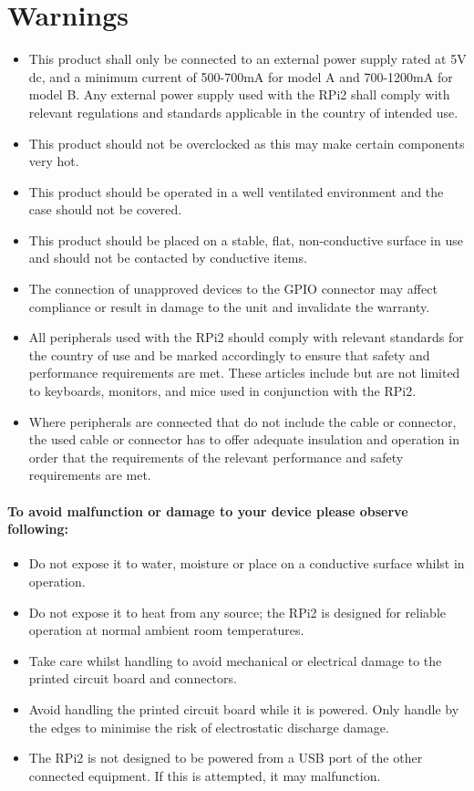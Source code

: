 \section{Warnings}
\begin{itemize}
\item This product shall only be connected to an external power supply rated at 5V dc, and a minimum current of 500-700mA for model A and 700-1200mA for model B. Any external power supply used with the RPi2 shall comply with relevant regulations and standards applicable in the country of intended use. 
\item This product should not be overclocked as this may make certain components very hot. 
\item This product should be operated in a well ventilated environment and the case should not be covered. 
\item This product should be placed on a stable, flat, non-conductive surface in use and should not be contacted by conductive items. 
\item The connection of unapproved devices to the GPIO connector may affect compliance or result in damage to the unit and invalidate the warranty. 
\item All peripherals used with the RPi2 should comply with relevant standards for the country of use and be marked accordingly to ensure that safety and performance requirements are met. These articles include but are not limited to keyboards, monitors, and mice used in conjunction with the RPi2.
\item Where peripherals are connected that do not include the cable or connector, the used cable or connector has to offer adequate insulation and operation in order that the requirements of the relevant performance and safety requirements are met.
\end{itemize}
\paragraph{To avoid malfunction or damage to your device please observe following:}
\begin{itemize}
\item Do not expose it to water, moisture or place on a conductive surface whilst in operation.
\item Do not expose it to heat from any source; the RPi2 is designed for reliable operation at normal ambient room temperatures.
\item Take care whilst handling to avoid mechanical or electrical damage to the printed circuit board and connectors.
\item Avoid handling the printed circuit board while it is powered. Only handle by the edges to minimise the risk of electrostatic discharge damage.
\item The RPi2 is not designed to be powered from a USB port of the other connected equipment. If this is attempted, it may malfunction.
\end{itemize}



